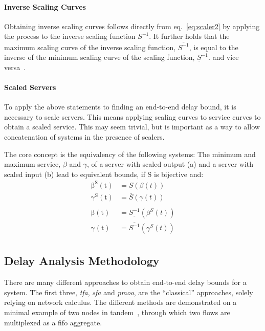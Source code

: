\paragraph{Inverse Scaling Curves}
Obtaining inverse scaling curves follows directly from eq.~\ref{eq:scaler2} by applying the process to the inverse scaling function $S^{-1}$.
It further holds that the maximum scaling curve of the inverse scaling function, $\overline{S^{-1}}$, is equal to the inverse of the minimum scaling curve of the scaling function, $\underline{S}^{-1}$.
and vice versa~\cite[p. 290 (4)]{fidler_way_2006}.

\paragraph{Scaled Servers}
\label{scaled_service}
To apply the above statements to finding an end-to-end delay bound, it is necessary to scale servers.
This means applying scaling curves to service curves to obtain a scaled service. This may seem trivial, but is
important as a way to allow concatenation of systems in the presence of scalers.
\par
The core concept is the equivalency of the following systems:
The minimum and maximum service, $\beta$ and $\gamma$, of a server with scaled output (a) and a server with scaled input (b)
lead to equivalent bounds, if S is bijective and:
\begin{equation}
\begin{aligned}
\mathrm{\beta^S(t)} &= \underline{S}(\beta(t))\\
\mathrm{\gamma^S(t)} &= \overline{S}(\gamma(t))\\
\\
\mathrm{\beta(t)} &= \underline{S^{-1}}(\beta^S(t))\\
\mathrm{\gamma(t)} &= \overline{S^{-1}}(\gamma^S(t))\\
\label{eq:scaler3}
\end{aligned}
\end{equation}
%

\subsection{Delay Analysis Methodology}


There are many different approaches to obtain end-to-end delay bounds for a system.
The first three, \emph{\gls{tfa}}, \emph{\gls{sfa}} and \emph{\gls{pmoo}}, are the \enquote{classical} approaches, solely relying on network calculus.
The different methods are demonstrated on a minimal example of two nodes in tandem~\cite{schmitt_comprehensive_2007}, through which two flows are multiplexed as a \gls{fifo} aggregate.

